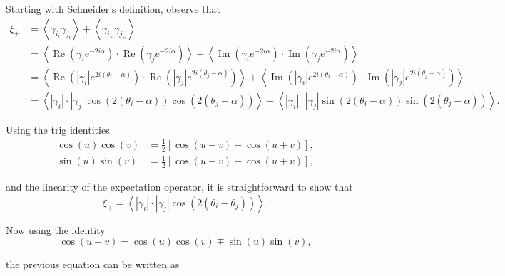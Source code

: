 \documentclass[%
 reprint,
 amsmath,amssymb,
 aps,nofootinbib
]{revtex4-1}
\begin{document}
Starting with Schneider's definition, observe that
\begin{align*}
\xi_+&=\left<\gamma_{i_t}\gamma_{j_t}\right>+\left<\gamma_{i_\times}\gamma_{j_\times}\right>\\
&=\left<\operatorname{Re}\left(\gamma_ie^{-2i\alpha}\right)\cdot\operatorname{Re}\left(\gamma_je^{-2i\alpha}\right)\right>+\left<\operatorname{Im}\left(\gamma_ie^{-2i\alpha}\right)\cdot\operatorname{Im}\left(\gamma_je^{-2i\alpha}\right)\right>\\
&=\left<\operatorname{Re}\left(|\gamma_i|e^{2i(\theta_i-\alpha)}\right)\cdot\operatorname{Re}\left(|\gamma_j|e^{2i(\theta_j-\alpha)}\right)\right>+\left<\operatorname{Im}\left(|\gamma_i|e^{2i(\theta_i-\alpha)}\right)\cdot\operatorname{Im}\left(|\gamma_j|e^{2i(\theta_j-\alpha)}\right)\right>\\
&=\left<|\gamma_i|\cdot|\gamma_j|\cos\left(2(\theta_i-\alpha)\right)\cos\left(2(\theta_j-\alpha)\right)\right>+\left<|\gamma_i|\cdot|\gamma_j|\sin\left(2(\theta_i-\alpha)\right)\sin\left(2(\theta_j-\alpha)\right)\right>.
\end{align*}

Using the trig identities
\begin{align}
\cos(u)\cos(v)&=\frac{1}{2}\left[\cos(u-v)+\cos(u+v)\right],\\
\sin(u)\sin(v)&=\frac{1}{2}\left[\cos(u-v)-\cos(u+v)\right],
\end{align}

and the linearity of the expectation operator, it is straightforward to show that
$$\xi_+=\left<|\gamma_i|\cdot|\gamma_j|\cos\left(2(\theta_i-\theta_j)\right)\right>.$$

Now using the identity
\begin{equation}\label{trig2}
\cos(u\pm v)=\cos\left(u\right)\cos\left(v\right)\mp\sin\left(u\right)\sin\left(v\right),
\end{equation}

the previous equation can be written as
\end{document}
